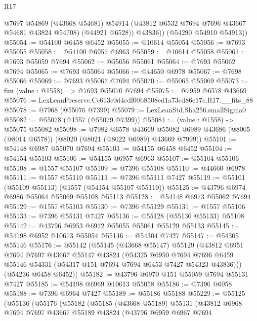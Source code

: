 \begin{lexlean}{R17}
\begin{coremodule}
            @7697
            @54869
            (@43668 @54681)
            @54914
            (@43812 @6532 @7694 @7696 @43667 @54681 @43824 @54708)
            (@44921 @6528))
          @43836))
      (@54290 @54910 @54913))
@55054 := @54100 @6458 @6452
@55055 := @10614 @55054
@55056 := @7693 @55055
@55058 := @54100 @6957 @6963
@55059 := @10614 @55058
@55061 := @7693 @55059 @7694
@55062 := @55056 @55061
@55064 := @7693 @55062 @7694
@55065 := @7693 @55064
@55066 := @44650 @6978
@55067 := @7698 @55066
@55069 := @7693 @55067 @7694
@55070 := @55065 @55069
@55073 := fun (value : @1558) => @7693 @55070 @7694
@55075 := @7959 @6578 @43669
@55076 := LexLeanPreserve.Cc613c0d4cdf00b8508ed1a73cd86e17c.R17.__fits_88
@55078 := @7968 (@55076 @7399)
@55079 := LexLeanStd.Sha256.smallSigma0
@55082 := @55078 (@1557 (@55079 @7399))
@55084 := (value : @1558) -> @55075 @55082
@55098 := @7982
    @6578
    @43669
    @55082
    @6989
    @43686
    (@8005 (@8014 @6578))
    (@8020 (@8021 (@8022 @6989) @43669 @7999))
@55101 := @54148 @6987 @55070 @7694
@55103 := @54155 @6458 @6452
@55104 := @54154 @55103
@55106 := @54155 @6957 @6963
@55107 := @55104 @55106
@55108 := @1557 @55107
@55109 := @7396 @55108
@55110 := @44660 @6978
@55111 := @1557 @55110
@55113 := @7396 @55111 @7427
@55119 := @55101 (@55109 @55113) (@1557 (@54154 @55107 @55110))
@55125 := @43796 @6974 @6986 @55064 @55069 @55108 @55113
@55128 := @54148 @6973 @55062 @7694
@55129 := @1557 @55103
@55130 := @7396 @55129
@55131 := @1557 @55106
@55133 := @7396 @55131 @7427
@55136 := @55128 (@55130 @55133) @55108
@55142 := @43796 @6953 @6972 @55055 @55061 @55129 @55133
@55145 := @54198 @6952 @10613 @55054
@55146 := @54304 @7427
@55147 := @54305 @55146
@55176 := @55142
    (@55145
      (@43668 @55147)
      @55129
      (@43812
        @6951
        @7694
        @7697
        @43667
        @55147
        @43824
        (@54325
          @6950
          @7694
          @7696
          @6459
          @55146
          @54331
          (@54317 @151 @7694 @7694 @6453 @7427 @54323 @43836)))
      (@54236 @6458 @6452))
@55182 := @43796 @6970 @151 @55059 @7694 @55131 @7427
@55185 := @54198 @6969 @10613 @55058
@55186 := @7396 @6958
@55188 := @7396 @6964 @7427
@55189 := @55186 @55188
@55229 := @55125
    (@55136
      (@55176
        (@55182
          (@55185
            (@43668 @55189)
            @55131
            (@43812
              @6968
              @7694
              @7697
              @43667
              @55189
              @43824
              (@43796
                @6959
                @6967
                @7694

\end{coremodule}
\end{lexlean}
